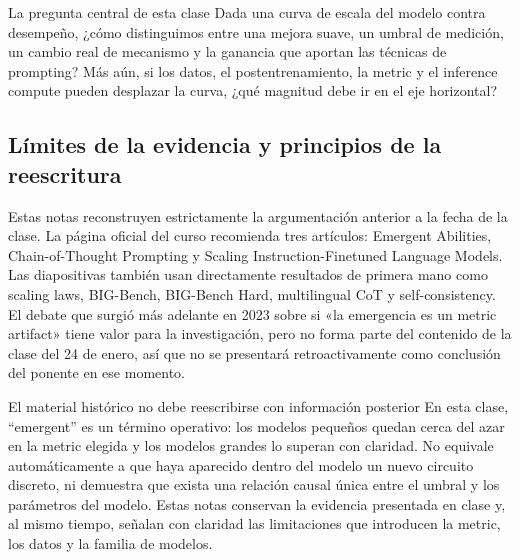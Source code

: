 \documentclass[a4paper]{article}
\begin{document}
\begin{importantbox}{La pregunta central de esta clase}
Dada una curva de escala del modelo contra desempeño, ¿cómo distinguimos entre una mejora suave, un umbral de medición, un cambio real de mecanismo y la ganancia que aportan las técnicas de prompting? Más aún, si los datos, el postentrenamiento, la metric y el inference compute pueden desplazar la curva, ¿qué magnitud debe ir en el eje horizontal?
\end{importantbox}


\subsection{Límites de la evidencia y principios de la reescritura}

Estas notas reconstruyen estrictamente la argumentación anterior a la fecha de la clase. La página oficial del curso recomienda tres artículos: Emergent Abilities, Chain-of-Thought Prompting y Scaling Instruction-Finetuned Language Models. Las diapositivas también usan directamente resultados de primera mano como scaling laws, BIG-Bench, BIG-Bench Hard, multilingual CoT y self-consistency. El debate que surgió más adelante en 2023 sobre si «la emergencia es un metric artifact» tiene valor para la investigación, pero no forma parte del contenido de la clase del 24 de enero, así que no se presentará retroactivamente como conclusión del ponente en ese momento.

\begin{warningbox}{El material histórico no debe reescribirse con información posterior}
En esta clase, ``emergent'' es un término operativo: los modelos pequeños quedan cerca del azar en la metric elegida y los modelos grandes lo superan con claridad. No equivale automáticamente a que haya aparecido dentro del modelo un nuevo circuito discreto, ni demuestra que exista una relación causal única entre el umbral y los parámetros del modelo. Estas notas conservan la evidencia presentada en clase y, al mismo tiempo, señalan con claridad las limitaciones que introducen la metric, los datos y la familia de modelos.
\end{warningbox}
\end{document}
